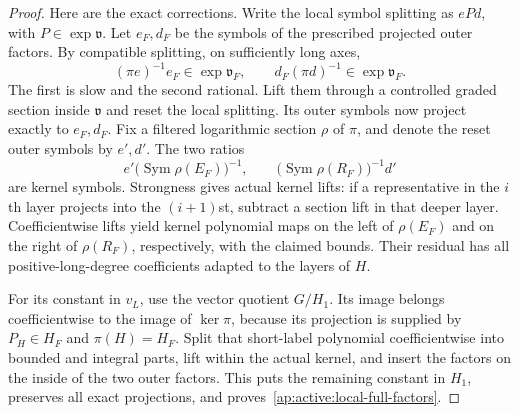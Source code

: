 \begin{proof}
Here are the exact corrections.  Write the local symbol splitting
as $ePd$, with $P\in\exp\mathfrak v$.  Let $e_F,d_F$ be the
symbols of the prescribed projected outer factors.  By compatible
splitting, on sufficiently long axes,
\[
       (\pi e)^{-1}e_F\in\exp\mathfrak v_F,
       \qquad d_F(\pi d)^{-1}\in\exp\mathfrak v_F.
\]
The first is slow and the second rational.  Lift them through a
controlled graded section inside $\mathfrak v$ and reset the local
splitting.  Its outer symbols now project exactly to $e_F,d_F$.
Fix a filtered logarithmic section $\rho$ of $\pi$, and denote the
reset outer symbols by $e',d'$.  The two ratios
\[
 e'\bigl(\operatorname{Sym}\rho(E_F)\bigr)^{-1},
 \qquad
 \bigl(\operatorname{Sym}\rho(R_F)\bigr)^{-1}d'
\]
are kernel symbols.  Strongness gives actual
kernel lifts: if a representative in the $i$th layer projects into
the $(i+1)$st, subtract a section lift in that deeper layer.
Coefficientwise lifts yield kernel polynomial maps on the left of
$\rho(E_F)$ and on the right of $\rho(R_F)$, respectively, with
the claimed bounds.  Their residual has all positive-long-degree
coefficients adapted to the layers of $H$.

For its constant in $v_L$, use the vector quotient $G/H_1$.
Its image belongs coefficientwise to the image of $\ker\pi$,
because its projection is supplied by $P_H\in H_F$ and
$\pi(H)=H_F$.  Split that short-label polynomial coefficientwise
into bounded and integral parts, lift within the actual kernel,
and insert the factors on the inside of the two outer factors.
This puts the remaining constant in $H_1$, preserves all exact
projections, and proves~\eqref{ap:active:local-full-factors}.


\end{proof}

